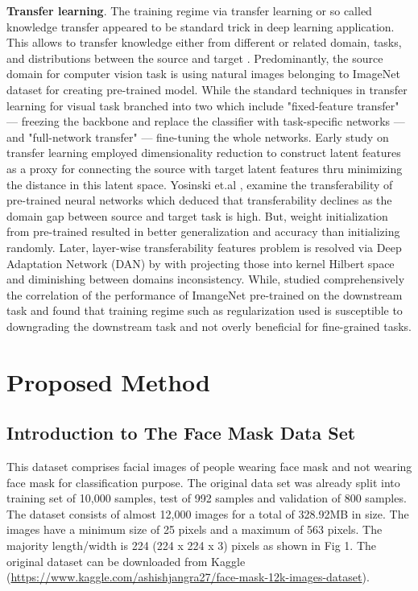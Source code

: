\documentclass[conference]{IEEEtran}
\begin{document}
\textbf{Transfer learning}. The training regime via transfer learning or so called knowledge transfer appeared to be standard trick in deep learning application. This allows to transfer knowledge either from different or related domain, tasks, and distributions between the source and target \cite{Pan2010ASO, Torrey2009Chapter1T}. Predominantly, the source domain for computer vision task is using natural images belonging to ImageNet\cite{5206848} dataset for creating pre-trained model. While the standard techniques in transfer learning for visual task branched into two which include "fixed-feature transfer" --- freezing the backbone and replace the classifier with task-specific networks --- and "full-network transfer"\cite{Salman2020DoAR} --- fine-tuning the whole networks. Early study on transfer learning employed dimensionality reduction to construct latent features as a proxy for connecting the source with target latent features thru minimizing the distance in this latent space\cite{Pan2008}. Yosinski et.al \cite{Yosinski2014HowTA}, examine the transferability of pre-trained neural networks which deduced that transferability declines as the domain gap between source and target task is high. But, weight initialization from pre-trained resulted in better generalization and accuracy than initializing randomly. Later, layer-wise transferability features problem is resolved via Deep Adaptation Network (DAN) by \cite{DBLP:conf/icml/LongC0J15} with projecting those into kernel Hilbert space and diminishing between domains inconsistency. While, \cite{Kornblith2019DoBI} studied comprehensively the correlation of the performance of ImangeNet pre-trained on the downstream task and found that training regime such as regularization used is susceptible to downgrading the downstream task and not overly beneficial for fine-grained tasks.

\section{Proposed Method}

\subsection{Introduction to The Face Mask Data Set}

This dataset comprises facial images of people wearing face mask and not wearing face mask for classification purpose. The original data set was already split into training set of 10,000 samples, test  of 992 samples and validation of 800 samples. The dataset consists of almost 12,000 images for a total of  328.92MB in size. The images have a minimum size of 25 pixels and a maximum of 563 pixels. The majority length/width is 224 (224 x 224 x 3) pixels as shown in Fig 1. The original dataset can be downloaded from Kaggle (\url{https://www.kaggle.com/ashishjangra27/face-mask-12k-images-dataset}).
\end{document}
